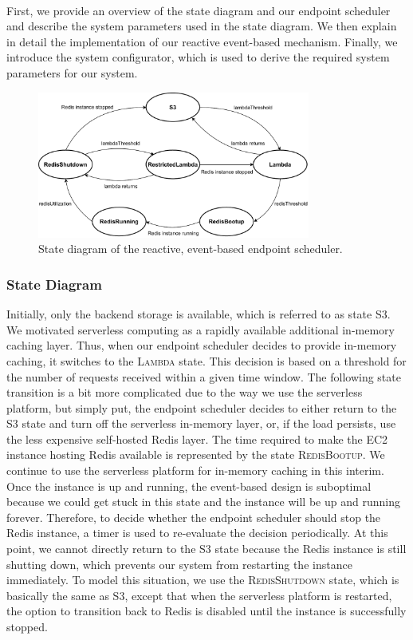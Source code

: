 ~\\
First, we provide an overview of the state diagram and our endpoint scheduler and describe the system parameters used in the state diagram. We then explain in detail the implementation of our reactive event-based mechanism. Finally, we introduce the system configurator, which is used to derive the required system parameters for our system.

\begin{figure}[t]
    \begin{center}
        \includegraphics[width=0.8\textwidth]{figures/endpoint_scheduler.pdf}
        \caption{State diagram of the reactive, event-based endpoint scheduler.}
        \label{fig:endpoint_scheduler}
    \end{center}
\end{figure}

\subsubsection{State Diagram}
Initially, only the backend storage is available, which is referred to as state \textsc{S3}. We motivated serverless computing as a rapidly available additional in-memory caching layer. Thus, when our endpoint scheduler decides to provide in-memory caching, it switches to the \textsc{Lambda} state. This decision is based on a threshold for the number of requests received within a given time window. The following state transition is a bit more complicated due to the way we use the serverless platform, but simply put, the endpoint scheduler decides to either return to the \textsc{S3} state and turn off the serverless in-memory layer, or, if the load persists, use the less expensive self-hosted Redis layer. The time required to make the EC2 instance hosting Redis available is represented by the state \textsc{RedisBootup}. We continue to use the serverless platform for in-memory caching in this interim. Once the instance is up and running, the event-based design is suboptimal because we could get stuck in this state and the instance will be up and running forever. Therefore, to decide whether the endpoint scheduler should stop the Redis instance, a timer is used to re-evaluate the decision periodically. At this point, we cannot directly return to the \textsc{S3} state because the Redis instance is still shutting down, which prevents our system from restarting the instance immediately. To model this situation, we use the \textsc{RedisShutdown} state, which is basically the same as \textsc{S3}, except that when the serverless platform is restarted, the option to transition back to Redis is disabled until the instance is successfully stopped.


